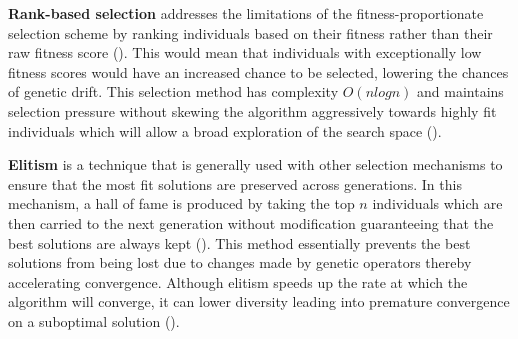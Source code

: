 \parbreak\noindent \textbf{Rank-based selection} addresses the limitations of the fitness-proportionate selection scheme by ranking individuals based on their fitness rather than their raw fitness score (\cite{mitchell1998introduction}). This would mean that individuals with exceptionally low fitness scores would have an increased chance to be selected, lowering the chances of genetic drift. This selection method has complexity $O(n log n)$ and maintains selection pressure without skewing the algorithm aggressively towards highly fit individuals which will allow a broad exploration of the search space (\cite{mitchell1998introduction}).

\parbreak\noindent \textbf{Elitism} is a technique that is generally used with other selection mechanisms to ensure that the most fit solutions are preserved across generations. In this mechanism, a hall of fame is produced by taking the top $n$ individuals which are then carried to the next generation without modification guaranteeing that the best solutions are always kept (\cite{mitchell1998introduction}). This method essentially prevents the best solutions from being lost due to changes made by genetic operators thereby accelerating convergence. Although elitism speeds up the rate at which the algorithm will converge, it can lower diversity leading into premature convergence on a suboptimal solution (\cite{malik2014preventing}).

